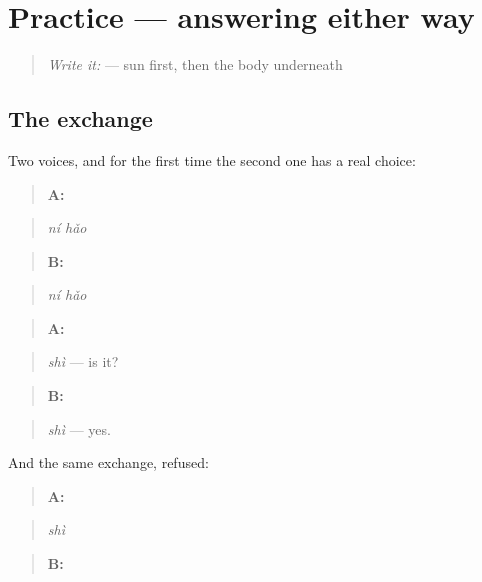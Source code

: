 \section[Practice]{Practice — answering either way}

\label{lesson:ZH-C05-practice}



\begin{quote}
\emph{Write it:}  — sun first, then the body underneath
\end{quote}

\subsection*{The exchange}
Two voices, and for the first time the second one has a real choice:

\begin{quote}
\textbf{A:} 
\end{quote}

\begin{quote}
\emph{ní hǎo}
\end{quote}

\begin{quote}
\textbf{B:} 
\end{quote}

\begin{quote}
\emph{ní hǎo}
\end{quote}

\begin{quote}
\textbf{A:} 
\end{quote}

\begin{quote}
\emph{shì} — is it?
\end{quote}

\begin{quote}
\textbf{B:} 
\end{quote}

\begin{quote}
\emph{shì} — yes.
\end{quote}

And the same exchange, refused:

\begin{quote}
\textbf{A:} 
\end{quote}

\begin{quote}
\emph{shì}
\end{quote}

\begin{quote}
\textbf{B:} 
\end{quote}

